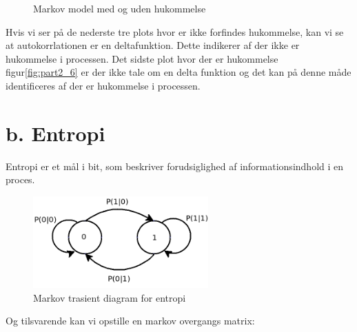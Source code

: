 \begin{figure}[!h]
	\centering
	\caption{Markov model med og uden hukommelse }
	\label{fig:part2_markov}
\end{figure}
Hvis vi ser på de nederste tre plots hvor er ikke forfindes hukommelse, kan vi se at autokorrlationen er en deltafunktion. Dette indikerer af der ikke er hukommelse i processen. Det sidste plot hvor der er hukommelse figur\ref{fig:part2_6} er der ikke tale om en delta funktion og det kan på denne måde identificeres af der er hukommelse i processen. 


\section{b. Entropi }
Entropi er et mål i bit, som beskriver forudsiglighed af informationsindhold i en proces.

 \begin{figure}[!h]
	\centering
	\includegraphics[width=0.6\textwidth]{resources/part2_entropi_diagram}
	\caption{Markov trasient diagram for entropi }
	\label{fig:part2_7}
\end{figure}
Og tilsvarende kan vi opstille en markov overgangs matrix:

